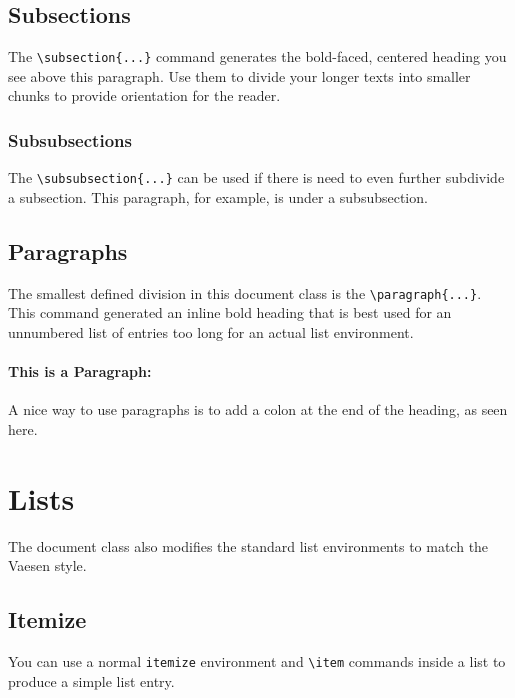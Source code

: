 \documentclass[english]{vaesen-supplement}
\begin{document}
\subsection{Subsections}
The \verb|\subsection{...}| command generates the bold-faced, centered heading you see above this paragraph. Use them to divide your longer texts into smaller chunks to provide orientation for the reader.

\subsubsection{Subsubsections}
The \verb|\subsubsection{...}| can be used if there is need to even further subdivide a subsection. This paragraph, for example, is under a subsubsection.

\subsection{Paragraphs}
The smallest defined division in this document class is the \verb|\paragraph{...}|. This command generated an inline bold heading that is best used for an unnumbered list of entries too long for an actual list environment.

\paragraph{This is a Paragraph:}
A nice way to use paragraphs is to add a colon at the end of the heading, as seen here.


\section{Lists}
The document class also modifies the standard list environments to match the Vaesen style.

\subsection{Itemize}
You can use a normal \verb|itemize| environment and \verb|\item| commands inside a list to produce a simple list entry.
\end{document}
